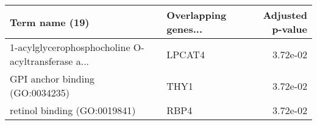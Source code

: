 \begin{tabular}{llr}
\toprule
                                    Term name (19) & Overlapping genes... &  Adjusted p-value \\
\midrule
1-acylglycerophosphocholine O-acyltransferase a... &               LPCAT4 &          3.72e-02 \\
                   GPI anchor binding (GO:0034235) &                 THY1 &          3.72e-02 \\
                      retinol binding (GO:0019841) &                 RBP4 &          3.72e-02 \\
\bottomrule
\end{tabular}
